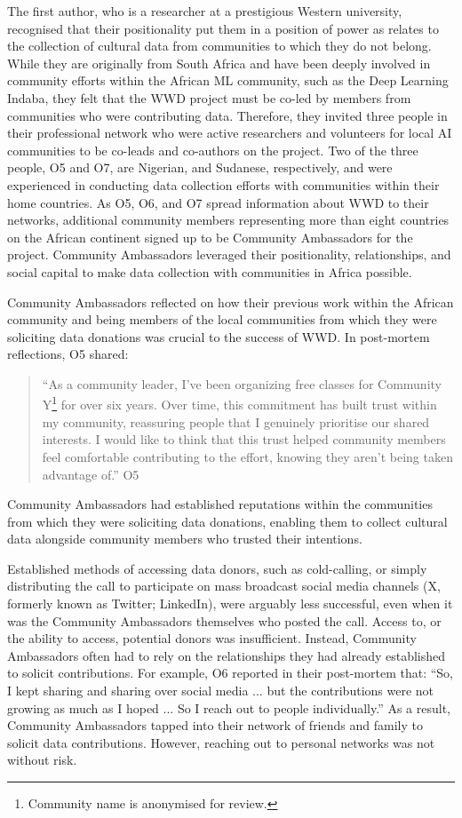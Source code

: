 The first author, who is a researcher at a prestigious Western university, recognised that their positionality put them in a position of power as relates to the collection of cultural data from communities to which they do not belong. While they are originally from South Africa and have been deeply involved in community efforts within the African ML community, such as the Deep Learning Indaba, they felt that the \textsc{WWD} project must be co-led by members from communities who were contributing data. Therefore, they invited three people in their professional network who were active researchers and volunteers for local AI communities to be co-leads and co-authors on the project. Two of the three people, O5 and O7, are Nigerian, and Sudanese, respectively, and were experienced in conducting data collection efforts with communities within their home countries. As O5, O6, and O7 spread information about \textsc{WWD} to their networks, additional community members representing more than eight countries on the African continent signed up to be Community Ambassadors for the project. Community Ambassadors leveraged their positionality, relationships, and social capital to make data collection with communities in Africa possible. 

Community Ambassadors reflected on how their previous work within the African community and being members of the local communities from which they were soliciting data donations was crucial to the success of \textsc{WWD}. In post-mortem reflections, O5 shared:
\begin{quote}
    ``As a community leader, I've been organizing free classes for Community Y\footnote{Community name is anonymised for review.} for over six years. Over time, this commitment has built trust within my community, reassuring people that I genuinely prioritise our shared interests. I would like to think that this trust helped community members feel comfortable contributing to the effort, knowing they aren’t being taken advantage of.'' O5
\end{quote}
Community Ambassadors had established reputations within the communities from which they were soliciting data donations, enabling them to collect cultural data alongside community members who trusted their intentions. 

Established methods of accessing data donors, such as cold-calling, or simply distributing the call to participate on mass broadcast social media channels (X, formerly known as Twitter; LinkedIn), were arguably less successful, even when it was the Community Ambassadors themselves who posted the call. Access to, or the ability to access, potential donors was insufficient. Instead, Community Ambassadors often had to rely on the relationships they had already established to solicit contributions. For example, O6 reported in their post-mortem that: ``So, I kept sharing and sharing over social media ... but the contributions were not growing as much as I hoped ... So I reach out to people individually.'' As a result, Community Ambassadors tapped into their network of friends and family to solicit data contributions. However, reaching out to personal networks was not without risk. 

